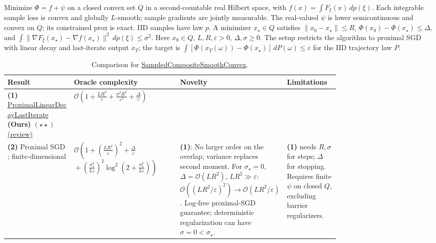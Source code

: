 \begin{table}[tp]
\centering
\caption{Comparison for \href{https://github.com/k3nfalt/longtails/blob/main/LongTails/Setups/SampledCompositeSmoothConvex.lean}{SampledCompositeSmoothConvex}.}\label{tab:SampledCompositeSmoothConvex}
\parbox{\linewidth}{\footnotesize Minimize $\Phi=f+\psi$ on a closed convex set $Q$ in a second-countable real Hilbert space, with $f(x)=\int F_\xi(x)\,dp(\xi)$. Each integrable sample loss is convex and globally $L$-smooth; sample gradients are jointly measurable. The real-valued $\psi$ is lower semicontinuous and convex on $Q$; its constrained prox is exact. IID samples have law $p$. A minimizer $x_\star\in Q$ satisfies $\|x_0-x_\star\|\le R$, $\Phi(x_0)-\Phi(x_\star)\le\Delta$, and $\int\|\nabla F_\xi(x_\star)-\nabla f(x_\star)\|^2\,dp(\xi)\le\sigma^2$. Here $x_0\in Q$, $L,R,\varepsilon>0$, $\Delta,\sigma\ge0$. The setup restricts the algorithm to proximal SGD with linear decay and last-iterate output $x_T$; the target is $\int[\Phi(x_T(\omega))-\Phi(x_\star)]\,dP(\omega)\le\varepsilon$ for the IID trajectory law $P$.}\par\smallskip
\begin{threeparttable}
\footnotesize
\setlength{\tabcolsep}{4pt}\renewcommand{\arraystretch}{1.25}
\begin{tabularx}{\linewidth}{@{}>{\raggedright\arraybackslash}p{0.20\linewidth}>{\raggedright\arraybackslash}p{0.32\linewidth}>{\raggedright\arraybackslash}p{0.25\linewidth}>{\raggedright\arraybackslash}X@{}}
\toprule
\textbf{Result} & \textbf{Oracle complexity} & \textbf{Novelty} & \textbf{Limitations} \\
\midrule
\textbf{(1)} \href{https://github.com/k3nfalt/longtails/blob/main/LongTails/Theorems/ProximalLinearDecayLastIterate.lean}{Proximal\allowbreak Linear\allowbreak Decay\allowbreak Last\allowbreak Iterate} \textbf{(Ours)} $(\star\star)$ \href{https://github.com/k3nfalt/longtails/blob/main/scripts/reviews/ProximalLinearDecayLastIterate.md}{(review)} & $\mathcal{O}\!\left(1+\frac{LR^2}{\varepsilon}+\frac{\sigma^2R^2}{\varepsilon^2}+\frac{\Delta}{\varepsilon}\right)$ & & \\
\midrule[1.2pt]
\textbf{(2)} Proximal SGD \citep[Theorem 3.1]{scscVaidyan2026v1}; finite-dimensional & $\mathcal{O}\!\left(1+\left(\frac{LR^2}{\varepsilon}\right)^2+\frac{\Delta}{\varepsilon}\right.$\newline $\left.{}+\left(\frac{\sigma_\star^2}{L\varepsilon}\right)^2\log^2\!\left(2+\frac{\sigma_\star^2}{L\varepsilon}\right)\right)$ & \textbf{(1)}: No larger order on the overlap; variance replaces second moment. For $\sigma_\star=0$, $\Delta=\mathcal{O}(LR^2)$, $LR^2\gg\varepsilon$: $\mathcal{O}((LR^2/\varepsilon)^2)\to\mathcal{O}(LR^2/\varepsilon)$. Log-free proximal-SGD guarantee; deterministic regularization can have $\sigma=0<\sigma_\star$. & \textbf{(1)} needs $R,\sigma$ for steps; $\Delta$ for stopping. Requires finite $\psi$ on closed $Q$, excluding barrier regularizers. \\

\end{tabularx}
\end{threeparttable}
\end{table}
